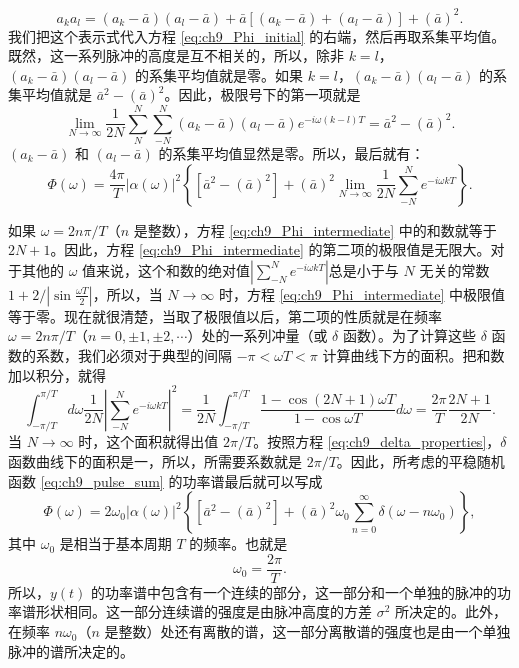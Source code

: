 \begin{equation*}
a_k a_l = (a_k - \bar{a})(a_l - \bar{a}) + \bar{a}[(a_k - \bar{a}) + (a_l - \bar{a})] + (\bar{a})^2.
\end{equation*}
我们把这个表示式代入方程 \eqref{eq:ch9_Phi_initial} 的右端，然后再取系集平均值。既然，这一系列脉冲的高度是互不相关的，所以，除非 $ k=l $，$ (a_k - \bar{a})(a_l - \bar{a}) $ 的系集平均值就是零。如果 $ k=l $，$ (a_k - \bar{a})(a_l - \bar{a}) $ 的系集平均值就是 $ \bar{a}^2 - (\bar{a})^2 $。因此，极限号下的第一项就是
\begin{equation*}
\lim_{N \to \infty} \frac{1}{2N} \sum_{N}^{N} \sum_{-N}^{N} (a_k - \bar{a})(a_l - \bar{a}) e^{-i\omega(k-l)T} = \bar{a}^2 - (\bar{a})^2.
\end{equation*}
$ (a_k - \bar{a}) $ 和 $ (a_l - \bar{a}) $ 的系集平均值显然是零。所以，最后就有：
\begin{equation}\label{eq:ch9_Phi_intermediate}
\Phi(\omega) = \frac{4\pi}{T} |\alpha(\omega)|^2 \left\{ \left[ \bar{a}^2 - (\bar{a})^2 \right] + (\bar{a})^2 \lim_{N \to \infty} \frac{1}{2N} \sum_{-N}^{N} e^{-i\omega k T} \right\}.
\end{equation}

如果 $ \omega=2n\pi/T $（$ n $ 是整数），方程 \eqref{eq:ch9_Phi_intermediate} 中的和数就等于 $ 2N+1 $。因此，方程 \eqref{eq:ch9_Phi_intermediate} 的第二项的极限值是无限大。对于其他的 $ \omega $ 值来说，这个和数的绝对值$\left| \sum_{-N}^{N} e^{-i\omega k T} \right|$总是小于与 $ N $ 无关的常数 $ 1+2/\left| \sin \frac{\omega T}{2} \right| $，所以，当 $ N \to \infty $ 时，方程 \eqref{eq:ch9_Phi_intermediate} 中极限值等于零。现在就很清楚，当取了极限值以后，第二项的性质就是在频率 $ \omega=2n\pi/T $（$ n=0, \pm 1, \pm 2, \cdots $）处的一系列冲量（或 $ \delta $ 函数）。为了计算这些 $ \delta $ 函数的系数，我们必须对于典型的间隔 $ -\pi<\omega T<\pi $ 计算曲线下方的面积。把和数加以积分，就得
\begin{equation*}
\int_{-\pi/T}^{\pi/T} d\omega \frac{1}{2N} \left| \sum_{-N}^{N} e^{-i\omega k T} \right|^2 = \frac{1}{2N} \int_{-\pi/T}^{\pi/T} \frac{1-\cos(2N+1)\omega T}{1-\cos\omega T} d\omega = \frac{2\pi}{T} \frac{2N+1}{2N}.
\end{equation*}
当 $ N \to \infty $ 时，这个面积就得出值 $ 2\pi/T $。按照方程 \eqref{eq:ch9_delta_properties}，$ \delta $ 函数曲线下的面积是一，所以，所需要系数就是 $ 2\pi/T $。因此，所考虑的平稳随机函数 \eqref{eq:ch9_pulse_sum} 的功率谱最后就可以写成
\begin{equation}
\Phi(\omega) = 2\omega_0 |\alpha(\omega)|^2 \left\{ \left[ \bar{a}^2 - (\bar{a})^2 \right] + (\bar{a})^2 \omega_0 \sum_{n=0}^{\infty} \delta(\omega-n\omega_0) \right\},
\end{equation}
其中 $ \omega_0 $ 是相当于基本周期 $ T $ 的频率。也就是
\begin{equation}\label{eq:ch9_omega0_def}
\omega_0 = \frac{2\pi}{T}.
\end{equation}
所以，$ y(t) $ 的功率谱中包含有一个连续的部分，这一部分和一个单独的脉冲的功率谱形状相同。这一部分连续谱的强度是由脉冲高度的方差 $ \sigma^2 $ 所决定的。此外，在频率 $ n\omega_0 $（$ n $ 是整数）处还有离散的谱，这一部分离散谱的强度也是由一个单独脉冲的谱所决定的。

